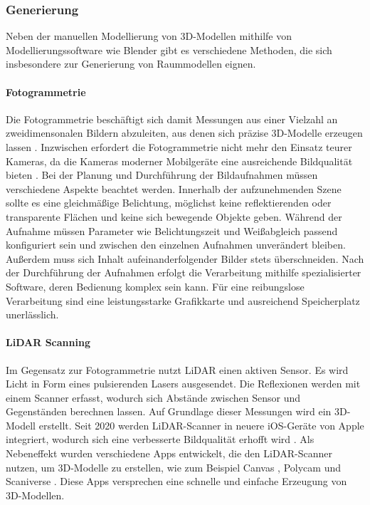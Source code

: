 \subsubsection{Generierung}
Neben der manuellen Modellierung von 3D-Modellen mithilfe von Modellierungssoftware wie Blender gibt es verschiedene Methoden, die sich insbesondere zur Generierung von Raummodellen eignen.

\paragraph{Fotogrammetrie}

Die Fotogrammetrie beschäftigt sich damit Messungen aus einer Vielzahl an zweidimensonalen Bildern abzuleiten, aus denen sich präzise 3D-Modelle erzeugen lassen \cite[S.~19]{Aber2010}. Inzwischen erfordert die Fotogrammetrie nicht mehr den Einsatz teurer Kameras, da die Kameras moderner Mobilgeräte eine ausreichende Bildqualität bieten \cite{Cohrs2021}. Bei der Planung und Durchführung der Bildaufnahmen müssen verschiedene Aspekte beachtet werden. Innerhalb der aufzunehmenden Szene sollte es eine gleichmäßige Belichtung, möglichst keine reflektierenden oder transparente Flächen und keine sich bewegende Objekte geben. Während der Aufnahme müssen Parameter wie Belichtungszeit und Weißabgleich passend konfiguriert sein und zwischen den einzelnen Aufnahmen unverändert bleiben. Außerdem muss sich Inhalt aufeinanderfolgender Bilder stets überschneiden.\cite{Cohrs2021b} Nach der Durchführung der Aufnahmen erfolgt die Verarbeitung mithilfe spezialisierter Software, deren Bedienung komplex sein kann. Für eine reibungslose Verarbeitung sind eine leistungsstarke Grafikkarte und ausreichend Speicherplatz unerlässlich.\cite{Cohrs2021c}

\paragraph{LiDAR Scanning}
Im Gegensatz zur Fotogrammetrie nutzt \ac{LiDAR} einen aktiven Sensor. Es wird Licht in Form eines pulsierenden Lasers ausgesendet. Die Reflexionen werden mit einem Scanner erfasst, wodurch sich Abstände zwischen Sensor und Gegenständen berechnen lassen. Auf Grundlage dieser Messungen wird ein 3D-Modell erstellt. Seit 2020 werden LiDAR-Scanner in neuere iOS-Geräte von Apple integriert, wodurch sich eine verbesserte Bildqualität erhofft wird \cite{Fenstermaker2022}. Als Nebeneffekt wurden verschiedene Apps entwickelt, die den LiDAR-Scanner nutzen, um 3D-Modelle zu erstellen, wie zum Beispiel Canvas \cite{Canvas2023}, Polycam \cite{Polycam2024} und Scaniverse \cite{Scaniverse2024}. Diese Apps versprechen eine schnelle und einfache Erzeugung von 3D-Modellen.


